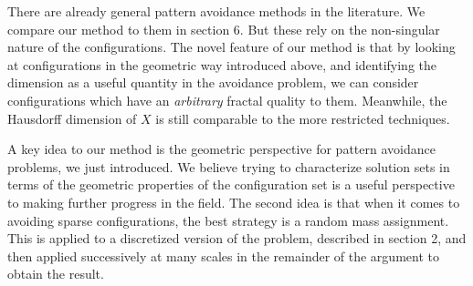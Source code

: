 \documentclass{article}
\theoremstyle{plain}
\theoremstyle{plain}
\begin{document}
There are already general pattern avoidance methods in the literature. We compare our method to them in section 6. But these rely on the non-singular nature of the configurations. The novel feature of our method is that by looking at configurations in the geometric way introduced above, and identifying the dimension as a useful quantity in the avoidance problem, we can consider configurations which have an {\it arbitrary} fractal quality to them. Meanwhile, the Hausdorff dimension of $X$ is still comparable to the more restricted techniques.

A key idea to our method is the geometric perspective for pattern avoidance problems, we just introduced. We believe trying to characterize solution sets in terms of the geometric properties of the configuration set is a useful perspective to making further progress in the field. The second idea is that when it comes to avoiding sparse configurations, the best strategy is a random mass assignment. This is applied to a discretized version of the problem, described in section 2, and then applied successively at many scales in the remainder of the argument to obtain the result.


%


\end{document}
